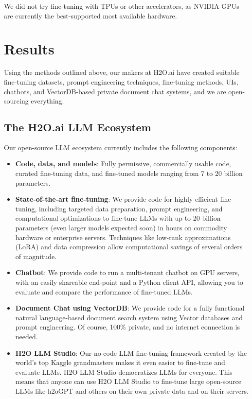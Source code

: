 \documentclass{article}
\begin{document}
We did not try fine-tuning with TPUs or other accelerators, as NVIDIA GPUs are currently the best-supported most available hardware.

\section{Results}
Using the methods outlined above, our makers at H2O.ai have created suitable fine-tuning datasets, prompt engineering techniques, fine-tuning methods, UIs, chatbots, and VectorDB-based private document chat systems, and we are open-sourcing everything.

\subsection{The H2O.ai LLM Ecosystem}
Our open-source LLM ecosystem currently includes the following components:
\begin{itemize}
\item \textbf{Code, data, and models}: Fully permissive, commercially usable code, curated fine-tuning data, and fine-tuned models ranging from 7 to 20 billion parameters.
\item \textbf{State-of-the-art fine-tuning}: We provide code for highly efficient fine-tuning, including targeted data preparation, prompt engineering, and computational optimizations to fine-tune LLMs with up to 20 billion parameters (even larger models expected soon) in hours on commodity hardware or enterprise servers. Techniques like low-rank approximations (LoRA) and data compression allow computational savings of several orders of magnitude.
\item \textbf{Chatbot}: We provide code to run a multi-tenant chatbot on GPU servers, with an easily shareable end-point and a Python client API, allowing you to evaluate and compare the performance of fine-tuned LLMs.
\item \textbf{Document Chat using VectorDB}: We provide code for a fully functional natural language-based document search system using Vector databases and prompt engineering. Of course, 100\% private, and no internet connection is needed.
\item \textbf{H2O LLM Studio}: Our no-code LLM fine-tuning framework created by the world's top Kaggle grandmasters makes it even easier to fine-tune and evaluate LLMs. H2O LLM Studio democratizes LLMs for everyone. This means that anyone can use H2O LLM Studio to fine-tune large open-source LLMs like h2oGPT and others on their own private data and on their servers.
\end{itemize}
\end{document}
